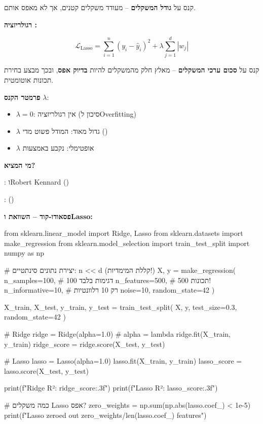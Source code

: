 קנס על \textbf{גודל המשקלים} – מעודד משקלים קטנים, אך לא מאפס אותם.

\textbf{רגולריזציה :}

\begin{equation}
\mathcal{L}_{\text{Lasso}} = \sum_{i=1}^{n} (y_i - \hat{y}_i)^2 + \lambda \sum_{j=1}^{d} |w_j|
\end{equation}

קנס על \textbf{סכום ערכי המשקלים} – מאלץ חלק מהמשקלים להיות \textbf{בדיוק אפס}, ובכך מבצע בחירת תכונות אוטומטית.

\textbf{פרמטר הקנס} $\lambda$:
\begin{itemize}
\item $\lambda = \num{0}$: אין רגולריזציה (סיכון ל\en{-}Overfitting)
\item $\lambda$ גדול מאוד: המודל פשוט מדי ()
\item $\lambda$ אופטימלי: נקבע באמצעות 
\end{itemize}

\textbf{מי המציא?}

:  ו\en{-}Robert Kennard () \cite{hoerl1970}

:  () \cite{tibshirani1996}

\textbf{פסאודו-קוד – השוואת  ו\en{-}Lasso:}

\begin{pythonbox}
from sklearn.linear_model import Ridge, Lasso
from sklearn.datasets import make_regression
from sklearn.model_selection import train_test_split
import numpy as np

# יצירת נתונים סינתטיים: n << d (קללת המימדיות!)
X, y = make_regression(
    n_samples=100,      # 100 דגימות בלבד
    n_features=500,     # 500 תכונות!
    n_informative=10,   # רק 10 רלוונטיות
    noise=10,
    random_state=42
)

X_train, X_test, y_train, y_test = train_test_split(
    X, y, test_size=0.3, random_state=42
)

# Ridge
ridge = Ridge(alpha=1.0)  # alpha = lambda
ridge.fit(X_train, y_train)
ridge_score = ridge.score(X_test, y_test)

# Lasso
lasso = Lasso(alpha=1.0)
lasso.fit(X_train, y_train)
lasso_score = lasso.score(X_test, y_test)

print(f"Ridge R²: {ridge_score:.3f}")
print(f"Lasso R²: {lasso_score:.3f}")

# כמה משקלים Lasso אפס?
zero_weights = np.sum(np.abs(lasso.coef_) < 1e-5)
print(f"Lasso zeroed out {zero_weights}/{len(lasso.coef_)} features")
\end{pythonbox}


